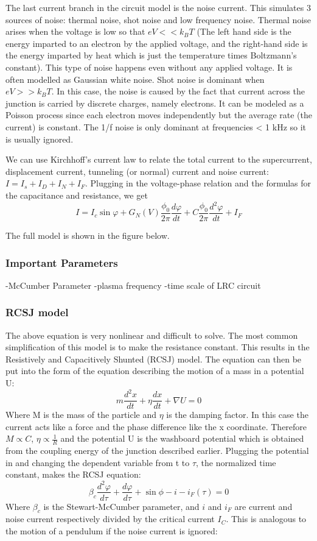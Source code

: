 \documentclass[conf]{new-aiaa}
\begin{document}
The last current branch in the circuit model is the noise current. This simulates 3 sources of noise: thermal noise, shot noise and low frequency noise. Thermal noise arises when the voltage is low so that $eV << k_B T$ (The left hand side is the energy imparted to an electron by the applied voltage, and the right-hand side is the energy imparted by heat which is just the temperature times Boltzmann's constant). This type of noise happens even without any applied voltage. It is often modelled as Gaussian white noise. Shot noise is dominant when $eV >> k_B T$. In this case, the noise is caused by the fact that current across the junction is carried by discrete charges, namely electrons. It can be modeled as a Poisson process since each electron moves independently but the average rate (the current) is constant. The 1/f noise is only dominant at frequencies < 1 kHz so it is usually ignored. \par
We can use Kirchhoff's current law to relate the total current to the supercurrent, displacement current, tunneling (or normal) current and noise current: $I = I_s + I_D  + I_N + I_F$. Plugging in the voltage-phase relation and the formulas for the capacitance and resistance, we get 
$$I = I_c \sin\varphi + G_N(V)\frac{\phi_0}{2\pi}\frac{d\varphi}{dt} + C\frac{\phi_0}{2\pi}\frac{d^2\varphi}{dt} + I_F$$

The full model is shown in the figure below.
\subsubsection{Important Parameters}
-McCumber Parameter
-plasma frequency
-time scale of LRC circuit


\subsubsection{RCSJ model}
The above equation is very nonlinear and difficult to solve. The most common simplification of this model is to make the resistance constant. This results in the Resistively and Capacitively Shunted (RCSJ) model. The equation can then be put into the form of the equation describing the motion of a mass in a potential U: 
$$m\frac{d^2x}{dt} + \eta\frac{dx}{dt} + \nabla U = 0$$
Where M is the mass of the particle and $\eta$ is the damping factor. In this case the current acts like a force and the phase difference like the x coordinate. Therefore $M \propto C$, $\eta \propto \frac{1}{R}$ and the potential U is the washboard potential which is obtained from the coupling energy of the junction described earlier. Plugging the potential in and changing the dependent variable from t to $\tau$, the normalized time constant, makes the RCSJ equation:
$$\beta_c \frac{d^2\varphi}{d\tau} + \frac{d\varphi}{d\tau} + \sin\phi - i - i_F(\tau) = 0$$
Where $\beta_c$ is the Stewart-McCumber parameter, and $i$ and $i_F$ are current and noise current respectively divided by the critical current $I_C$. This is analogous to the motion of a pendulum if the noise current is ignored:
\end{document}
